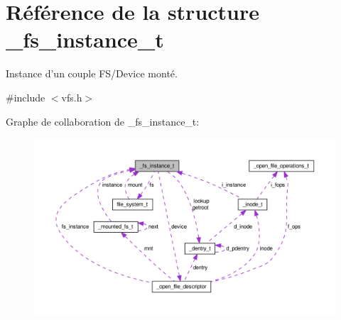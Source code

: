 \hypertarget{struct__fs__instance__t}{\section{Référence de la structure \-\_\-fs\-\_\-instance\-\_\-t}
\label{struct__fs__instance__t}
}


Instance d'un couple F\-S/\-Device monté.  




{\ttfamily \#include $<$vfs.\-h$>$}



Graphe de collaboration de \-\_\-fs\-\_\-instance\-\_\-t\-:\nopagebreak
\begin{figure}[H]
\begin{center}
\leavevmode
\includegraphics[width=350pt]{struct__fs__instance__t__coll__graph}
\end{center}
\end{figure}
